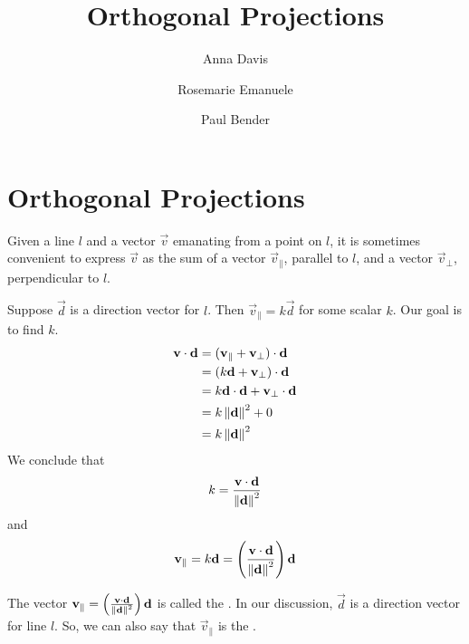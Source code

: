 \documentclass{ximera}
\author{Anna Davis \and Rosemarie Emanuele \and Paul Bender} \title{Orthogonal Projections} \license{CC-BY 4.0}
\begin{document}
\begin{abstract}
\end{abstract}
\maketitle

\section*{Orthogonal Projections}

Given a line $l$ and a vector $\vec{v}$ emanating from a point on $l$, it is sometimes convenient to express $\vec{v}$ as the sum of a vector $\vec{v}_{\parallel}$, parallel to $l$, and a vector $\vec{v}_{\perp}$, perpendicular to $l$.

\begin{center}

\end{center}

Suppose $\vec{d}$ is a direction vector for $l$.  Then $\vec{v}_
{\parallel}=k\vec{d}$ for some scalar $k$.  Our goal is to find $k$.  
\begin{align*}\mathbf{v}\cdot\mathbf{d}&=(\mathbf{v}_{\parallel}+\mathbf{v}_{\perp})\cdot\mathbf{d}\\
&=(k\mathbf{d}+\mathbf{v}_{\perp})\cdot\mathbf{d}\\
&=k\mathbf{d}\cdot\mathbf{d}+\mathbf{v}_{\perp}\cdot\mathbf{d}\\
&=k\left\lVert\mathbf{d}\right\rVert^2+0\\
&=k\left\lVert\mathbf{d}\right\rVert^2
\end{align*}
We conclude that $$k=\frac{\mathbf{v}\cdot\mathbf{d}}{\left\lVert\mathbf{d}\right\rVert^2}$$
and $$\mathbf{v}_{\parallel}=k\mathbf{d}=\left(\frac{\mathbf{v}\cdot\mathbf{d}}{\left\lVert\mathbf{d}\right\rVert^2}\right)\mathbf{d}$$

The vector $\mathbf{v}_{\parallel}=\left(\frac{\mathbf{v}\cdot\mathbf{d}}{\left\lVert\mathbf{d}\right\rVert^2}\right)\mathbf{d}$ is called the .  In our discussion, $\vec{d}$ is a direction vector for line $l$.  So, we can also say that $\vec{v}_{\parallel}$ is the .
\end{document}
